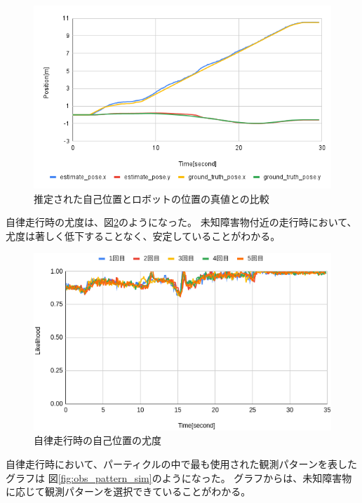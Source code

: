 \begin{figure}[H]
  \begin{center}
    \includegraphics[width=0.98\linewidth]{figs/sim_imp_ground_truth.png}
    \caption{推定された自己位置とロボットの位置の真値との比較}
    \label{fig:odom_comp_imp}
  \end{center}
\end{figure}

自律走行時の尤度は、図\ref{fig:nav_likelihood_imp}のようになった。
未知障害物付近の走行時において、尤度は著しく低下することなく、安定していることがわかる。

\begin{figure}[H]
  \begin{center}
    \includegraphics[width=0.98\linewidth]{figs/sim_likelihood_after.png}
    \caption{自律走行時の自己位置の尤度}
    \label{fig:nav_likelihood_imp}
  \end{center}
\end{figure}

自律走行時において、パーティクルの中で最も使用された観測パターンを表したグラフは
図\ref{fig:obs_pattern_sim}のようになった。
グラフからは、未知障害物に応じて観測パターンを選択できていることがわかる。

